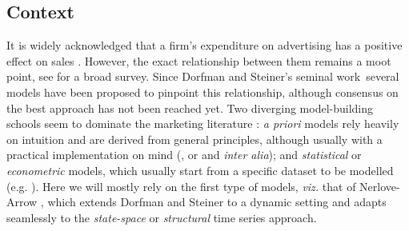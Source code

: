 
\subsection{Context}

It is widely acknowledged that a firm's expenditure  on advertising has a positive effect on sales \parencite{assmus1984advertising, tellis2007advertising, luo2012does, wiesel2011practice}. However, the exact relationship between them remains a moot point, see \parencite{tellis2009generalizations} for a broad survey. Since Dorfman and Steiner's \parencite{dorfman1954optimal} seminal work\, several models have been proposed to pinpoint this relationship, although consensus on the best approach has not been reached yet. Two diverging model-building schools seem to dominate the marketing literature \parencite{little1979aggregate}: \emph{a priori} models rely heavily on intuition and are derived from general principles, although usually with a practical implementation on mind (\parencite{nerlove1962optimal}, or \parencite{vidale1957operations} and \parencite{little1975brandaid} \emph{inter alia}); and  \emph{statistical} or \emph{econometric} models, which usually start from a specific dataset to be modelled (e.g. \parencite{assmus1984advertising}). Here we will mostly rely on the first type of models, \emph{viz.} that of Nerlove-Arrow \parencite{nerlove1962optimal}, which extends  Dorfman and Steiner to a dynamic setting \parencite{bagwell2007economic} and adapts seamlessly to the \emph{state-space} or \emph{structural} time series approach.



